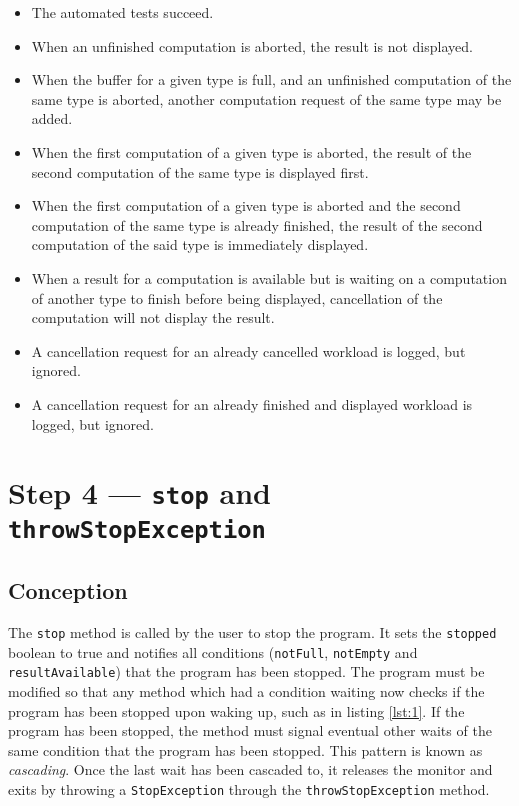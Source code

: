 \documentclass{article}
\begin{document}
    \begin{itemize}
        \item The automated tests succeed.
        \item When an unfinished computation is aborted, the result is not displayed.
        \item When the buffer for a given type is full, and an unfinished computation of the same type is aborted, another computation request of the same type may be added.
        \item When the first computation of a given type is aborted, the result of the second computation of the same type is displayed first.
        \item When the first computation of a given type is aborted and the second computation of the same type is already finished, the result of the second computation of the said type is immediately displayed.
        \item When a result for a computation is available but is waiting on a computation of another type to finish before being displayed, cancellation of the computation will not display the result.
        \item A cancellation request for an already cancelled workload is logged, but ignored.
        \item A cancellation request for an already finished and displayed workload is logged, but ignored.
    \end{itemize}

    \section*{Step 4 --- \texttt{stop} and \texttt{throwStopException}}

    \subsection*{Conception}

    The \texttt{stop} method is called by the user to stop the program.
    It sets the \texttt{stopped} boolean to true and notifies all conditions (\texttt{notFull}, \texttt{notEmpty} and \texttt{resultAvailable}) that the program has been stopped.
    The program must be modified so that any method which had a condition waiting now checks if the program has been stopped upon waking up, such as in listing \ref{lst:1}.
    If the program has been stopped, the method must signal eventual other waits of the same condition that the program has been stopped.
    This pattern is known as \textit{cascading}.
    Once the last wait has been cascaded to, it releases the monitor and exits by throwing a \texttt{StopException} through the \texttt{throwStopException} method.
\end{document}

